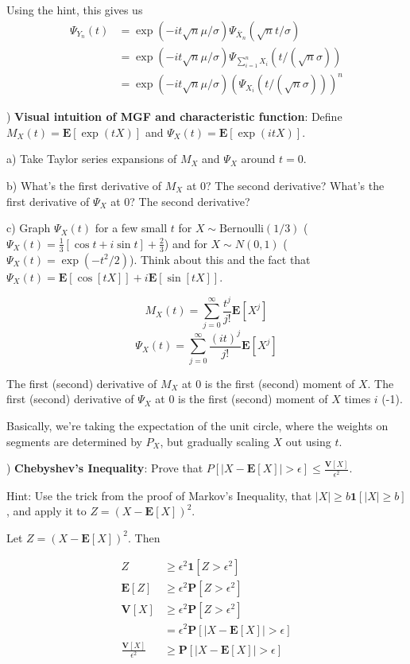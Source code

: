 \documentclass[12pt,english]{article}
\begin{document}
Using the hint, this gives us
\begin{align*}
\Psi_{Y_{n}}(t) & = \exp(-it\sqrt{n}\mu/\sigma) \Psi_{\overline{X}_{n}}(\sqrt{n} t / \sigma) \\
& = \exp(-it\sqrt{n}\mu/\sigma) \Psi_{\sum_{i=1}^{n} X_{i}}(t / (\sqrt{n}\sigma)) \\
& = \exp(-it\sqrt{n}\mu/\sigma) \left( \Psi_{X_{i}}(t / (\sqrt{n}\sigma)) \right)^{n}
\end{align*}

\vspace{1em}
) \textbf{Visual intuition of MGF and characteristic function}: Define $M_{X}(t) = \mathbf{E}[\exp(tX)]$ and $\Psi_{X}(t) = \mathbf{E}[\exp(itX)]$.

\noindent
a) Take Taylor series expansions of $M_{X}$ and $\Psi_{X}$ around $t = 0$.

\noindent
b) What's the first derivative of $M_{X}$ at 0? The second derivative? What's the first derivative of $\Psi_{X}$ at 0? The second derivative?

\noindent
c) Graph $\Psi_{X}(t)$ for a few small $t$ for $X \sim \text{Bernoulli}(1/3)$ ($\Psi_{X}(t) = \frac{1}{3}[\cos t + i \sin t] + \frac{2}{3}$) and for $X \sim N(0, 1)$ ($\Psi_{X}(t) = \exp(-t^{2}/2)$). Think about this and the fact that $\Psi_{X}(t) = \mathbf{E}[\cos[tX]] + i \mathbf{E}[\sin[tX]]$.
\vspace{1em}

$$ M_{X}(t) = \sum_{j=0}^{\infty} \frac{t^{j}}{j!} \mathbf{E}[X^{j}] $$
$$ \Psi_{X}(t) = \sum_{j=0}^{\infty} \frac{(it)^{j}}{j!} \mathbf{E}[X^{j}] $$

The first (second) derivative of $M_{X}$ at 0 is the first (second) moment of $X$. The first (second) derivative of $\Psi_{X}$ at 0 is the first (second) moment of $X$ times $i$ (-1).

Basically, we're taking the expectation of the unit circle, where the weights on segments are determined by $P_{X}$, but gradually scaling $X$ out using $t$.

\vspace{1em}
) \textbf{Chebyshev's Inequality}: Prove that $P[\left| X - \mathbf{E}[X] \right| > \epsilon] \leq \frac{\mathbf{V}[X]}{\epsilon^{2}}$.

Hint: Use the trick from the proof of Markov's Inequality, that $|X| \geq b \mathbf{1}[|X| \geq b]$, and apply it to $Z = (X - \mathbf{E}[X])^{2}$.
\vspace{1em}

Let $Z = (X - \mathbf{E}[X])^{2}$. Then

\begin{align*}
Z & \geq \epsilon^{2} \mathbf{1}[Z > \epsilon^{2}] \\
\mathbf{E}[Z] & \geq \epsilon^{2} \mathbf{P}[Z > \epsilon^{2}] \\
\mathbf{V}[X] & \geq \epsilon^{2} \mathbf{P}[Z > \epsilon^{2}] \\
& = \epsilon^{2} \mathbf{P}[|X - \mathbf{E}[X]| > \epsilon] \\
\frac{\mathbf{V}[X]}{\epsilon^{2}} & \geq \mathbf{P}[|X - \mathbf{E}[X]| > \epsilon]
\end{align*}
\end{document}
